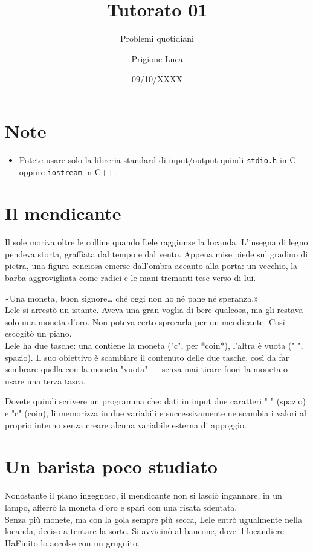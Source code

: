 \documentclass[a4paper]{article}
\title{Tutorato 01}
\subtitle{Problemi quotidiani}
\author{Prigione Luca}
\date{09/10/XXXX}
\begin{document}
\pagestyle{empty}

\maketitle

\section*{Note}
    \begin{itemize}
        \item Potete usare solo la libreria standard di input/output quindi \texttt{stdio.h} in C oppure \texttt{iostream} in C++.
    \end{itemize}

\section*{Il mendicante}
Il sole moriva oltre le colline quando Lele raggiunse la locanda. L'insegna di legno pendeva storta, graffiata dal tempo e dal vento.
Appena mise piede sul gradino di pietra, una figura cenciosa emerse dall’ombra accanto alla porta: un vecchio, la barba aggrovigliata come radici e le mani tremanti tese verso di lui.

«Una moneta, buon signore… ché oggi non ho né pane né speranza.»\\
Lele si arrestò un istante. Aveva una gran voglia di bere qualcosa, ma gli restava solo una moneta d’oro. Non poteva certo sprecarla per un mendicante.
Così escogitò un piano.\\
Lele ha due tasche: una contiene la moneta ("c", per *coin*), l’altra è vuota (" ", spazio). Il suo obiettivo è scambiare il contenuto delle due tasche, così da far sembrare quella con la moneta "vuota" — senza mai tirare fuori la moneta o usare una terza tasca.

Dovete quindi scrivere un programma che: dati in input due caratteri " " (spazio) e "c" (coin), li memorizza in due variabili e successivamente ne scambia i valori al proprio interno senza creare alcuna variabile esterna di appoggio.

\section*{Un barista poco studiato}
Nonostante il piano ingegnoso, il mendicante non si lasciò ingannare, in un lampo, afferrò la moneta d’oro e sparì con una risata sdentata.\\
Senza più monete, ma con la gola sempre più secca, Lele entrò ugualmente nella locanda, deciso a tentare la sorte.
Si avvicinò al bancone, dove il locandiere HaFinito lo accolse con un grugnito.
\end{document}
